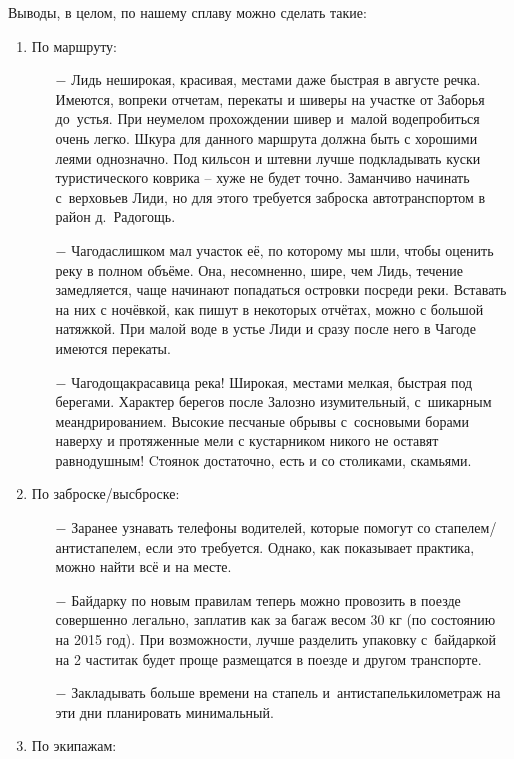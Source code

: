 Выводы, в целом, по нашему сплаву можно сделать такие:
\begin{enumerate}
	\setlength{\itemindent}{-1em}
	\item По маршруту:
	\begin{enumerate}
		\setlength{\itemindent}{0em}
		\item [$-$] Лидь неширокая, красивая, местами даже быстрая в августе речка. Имеются, вопреки отчетам, перекаты и шиверы на участке от Заборья до~устья. При неумелом прохождении шивер и~малой воде\mdash пробиться очень легко. Шкура для данного маршрута должна быть с хорошими леями однозначно. Под кильсон и штевни лучше подкладывать куски туристического коврика – хуже не будет точно. Заманчиво начинать с~верховьев Лиди, но для этого требуется заброска автотранспортом в район д.~Радогощь.
		\item [$-$] Чагода\mdash слишком мал участок её, по которому мы шли, чтобы оценить реку в полном объёме. Она, несомненно, шире, чем Лидь, течение замедляется, чаще начинают попадаться островки посреди реки. Вставать на них с ночёвкой, как пишут в некоторых отчётах, можно с большой натяжкой. При малой воде в устье Лиди и сразу после него в Чагоде имеются перекаты.
		\item [$-$] Чагодоща\mdash красавица река! Широкая, местами мелкая, быстрая под берегами. Характер берегов после Залозно изумительный, с~шикарным меандрированием. Высокие песчаные обрывы с~сосновыми борами наверху и протяженные мели с кустарником никого не оставят равнодушным! Cтоянок достаточно, есть и со столиками, скамьями.
	\end{enumerate}
	\item По заброске/высброске:
		\begin{enumerate}
		\setlength{\itemindent}{0em}
		\item [$-$] Заранее узнавать телефоны водителей, которые помогут со стапелем/антистапелем, если это требуется. Однако, как показывает практика, можно найти всё и на месте.
		\item [$-$] Байдарку по новым правилам теперь можно провозить в поезде совершенно легально, заплатив как за багаж весом 30 кг (по состоянию на 2015 год). При возможности, лучше разделить упаковку с~байдаркой на 2 части\mdash так будет проще размещатся в поезде и другом транспорте.
		\item [$-$] Закладывать больше времени на стапель и~антистапель\mdash километраж на эти дни планировать минимальный.  
	\end{enumerate}
	\item По экипажам:

\end{enumerate}
